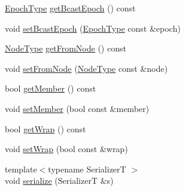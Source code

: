 \begin{DoxyCompactItemize}
\item 
\hyperlink{namespacevt_a985a5adf291c34a3ca263b3378388236}{Epoch\+Type} \hyperlink{structvt_1_1vrt_1_1collection_1_1_collection_message_a81604b8f38e3ee3eea6caf6a1012175c}{get\+Bcast\+Epoch} () const
\item 
void \hyperlink{structvt_1_1vrt_1_1collection_1_1_collection_message_a513a81678ec43a110e39d957735831bd}{set\+Bcast\+Epoch} (\hyperlink{namespacevt_a985a5adf291c34a3ca263b3378388236}{Epoch\+Type} const \&epoch)
\item 
\hyperlink{namespacevt_a866da9d0efc19c0a1ce79e9e492f47e2}{Node\+Type} \hyperlink{structvt_1_1vrt_1_1collection_1_1_collection_message_a642d64890e3ef47a5561ceaede752181}{get\+From\+Node} () const
\item 
void \hyperlink{structvt_1_1vrt_1_1collection_1_1_collection_message_a5bd7fd9ea84e15d528e1546a98f4bd5e}{set\+From\+Node} (\hyperlink{namespacevt_a866da9d0efc19c0a1ce79e9e492f47e2}{Node\+Type} const \&node)
\item 
bool \hyperlink{structvt_1_1vrt_1_1collection_1_1_collection_message_a6e3627adc70baecfd59a095e70729fee}{get\+Member} () const
\item 
void \hyperlink{structvt_1_1vrt_1_1collection_1_1_collection_message_a7ab28aae693beb9ffea7eed409fe3ccf}{set\+Member} (bool const \&member)
\item 
bool \hyperlink{structvt_1_1vrt_1_1collection_1_1_collection_message_adb0f0904b4bd0646e51dc0a76c54d487}{get\+Wrap} () const
\item 
void \hyperlink{structvt_1_1vrt_1_1collection_1_1_collection_message_a0c5a8830f6079278d7df90d0b6fc07b5}{set\+Wrap} (bool const \&wrap)
\item 
{\footnotesize template$<$typename SerializerT $>$ }\\void \hyperlink{structvt_1_1vrt_1_1collection_1_1_collection_message_a330305ca4c3bf4fec81d0f02637b9a59}{serialize} (SerializerT \&s)
\end{DoxyCompactItemize}
